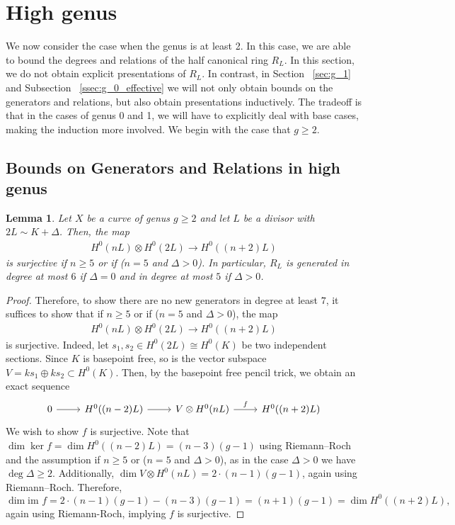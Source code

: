 \documentclass{amsart}
\theoremstyle{plain}
\newtheorem{lem}[thm]{Lemma}
\theoremstyle{definition}
\theoremstyle{remark}
\numberwithin{equation}{section}
\newcommand\ssec{\subsection}
\newcommand\im{\text{im }}
\begin{document}

\section{High genus}
\label{sec:g_high}
We now consider the case when the genus is at least 2. In this case, we are able to bound the degrees and relations of the half canonical ring $R_L$. In this section, we do not obtain explicit presentations of $R_L.$ In contrast, in Section ~\ref{sec:g_1} and Subsection ~\ref{ssec:g_0_effective} we will not only obtain bounds on the generators and relations, but also obtain presentations inductively. The tradeoff is that in the cases of genus 0 and 1, we will have to explicitly deal with base cases, making the induction more involved. We begin with the case that $g \geq 2$.

\ssec{Bounds on Generators and Relations in high genus}

\begin{lem}
\label{lem:semicanonical_generation}
Let $X$ be a curve of genus $g \geq 2$ and let $L$ be a divisor with $2 L \sim K + \Delta$. Then, the map
\begin{align*}
	H^0(nL) \otimes H^0(2L) \rightarrow H^0((n+2)L)
\end{align*}
is surjective if $n \geq 5$ or if ($n = 5$ and $\Delta > 0$).
In particular, $R_L$ is generated in degree at most $6$ if $\Delta = 0$ and in degree at most $5$ if $\Delta > 0$.
\end{lem}
\begin{proof}
Therefore, to show there are no new generators in degree at least $7$, it suffices to show that if $n \geq 5$ or if ($n = 5$ and $\Delta > 0$), the map
\begin{align*}
	H^0(nL) \otimes H^0(2L) \rightarrow H^0((n+2)L)
\end{align*}
is surjective. Indeed, let $s_1,s_2 \in H^0(2L) \cong H^0(K)$ be two independent sections. 
Since $K$ is basepoint free, so is the vector subspace $V = ks_1 \oplus k s_2 \subset H^0(K)$. 
Then, by the basepoint free pencil trick, we obtain an exact sequence
$$\begin{tikzcd}
0 \ar r & H^0((n-2)L) \ar r & V \otimes H^0(nL) \ar{r}{f} & H^0((n+2)L)
\end{tikzcd}$$
We wish to show $f$ is surjective.
Note that $\dim \ker f = \dim H^0((n-2)L) = (n-3)(g-1)$ using Riemann--Roch and the assumption if $n \geq 5$ or ($n = 5$ and $\Delta > 0$), as in the case $\Delta > 0$ we have $\deg \Delta \geq 2$.
Additionally, $\dim V \otimes H^0(nL) = 2 \cdot (n-1)(g-1)$, again using Riemann--Roch.
Therefore, $$\dim \im f = 2 \cdot (n-1)(g-1) -(n-3)(g-1) = (n+1)(g-1) = \dim H^0((n+2)L),$$
again using Riemann-Roch, implying $f$ is surjective.
\end{proof}
\end{document}

